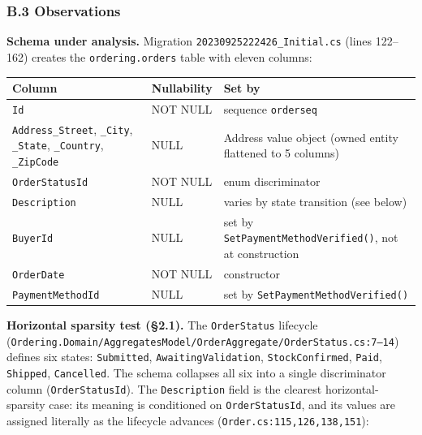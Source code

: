 \documentclass[
]{article}
\newcounter{none} %
\let\origtexttt\texttt%
\renewcommand{\texttt}[1]{\origtexttt{\seqsplit{#1}}}%
\let\texttt\origtexttt%
\begin{document}
\subsubsection{B.3 Observations}\label{b.3-observations}

\textbf{Schema under analysis.} Migration
\texttt{20230925222426\_Initial.cs} (lines 122--162) creates the
\texttt{ordering.orders} table with eleven columns:

{\def\LTcaptype{none} %
\begin{longtable}[]{@{}
  >{\raggedright\arraybackslash}p{}
  >{\raggedright\arraybackslash}p{}
  >{\raggedright\arraybackslash}p{}@{}}
\toprule\noalign{}
\begin{minipage}[b]{\linewidth}\raggedright
Column
\end{minipage} & \begin{minipage}[b]{\linewidth}\raggedright
Nullability
\end{minipage} & \begin{minipage}[b]{\linewidth}\raggedright
Set by
\end{minipage} \\
\midrule\noalign{}
\endhead
\bottomrule\noalign{}
\endlastfoot
\texttt{Id} & NOT NULL & sequence \texttt{orderseq} \\
\texttt{Address\_Street}, \texttt{\_City}, \texttt{\_State},
\texttt{\_Country}, \texttt{\_ZipCode} & NULL & Address value object
(owned entity flattened to 5 columns) \\
\texttt{OrderStatusId} & NOT NULL & enum discriminator \\
\texttt{Description} & NULL & varies by state transition (see below) \\
\texttt{BuyerId} & NULL & set by \texttt{SetPaymentMethodVerified()},
not at construction \\
\texttt{OrderDate} & NOT NULL & constructor \\
\texttt{PaymentMethodId} & NULL & set by
\texttt{SetPaymentMethodVerified()} \\
\end{longtable}
}

\textbf{Horizontal sparsity test (§2.1).} The \texttt{OrderStatus}
lifecycle
(\texttt{Ordering.Domain/AggregatesModel/OrderAggregate/OrderStatus.cs:7–14})
defines six states: \texttt{Submitted}, \texttt{AwaitingValidation},
\texttt{StockConfirmed}, \texttt{Paid}, \texttt{Shipped},
\texttt{Cancelled}. The schema collapses all six into a single
discriminator column (\texttt{OrderStatusId}). The \texttt{Description}
field is the clearest horizontal-sparsity case: its meaning is
conditioned on \texttt{OrderStatusId}, and its values are assigned
literally as the lifecycle advances (\texttt{Order.cs:115,126,138,151}):
\end{document}

